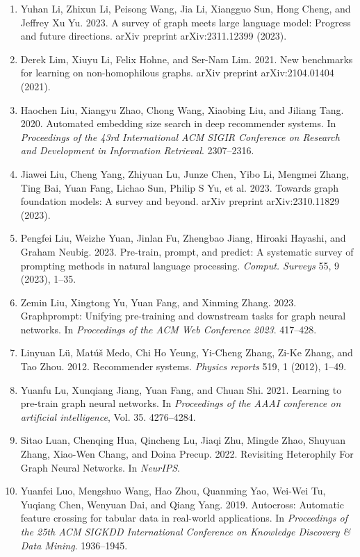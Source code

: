 \documentclass[11pt,UTF8,fontset=fandol]{ctexart}
\begin{document}
\begin{enumerate}[leftmargin=2em,labelsep=0.5em]
\item Yuhan Li, Zhixun Li, Peisong Wang, Jia Li, Xiangguo Sun, Hong Cheng, and Jeffrey Xu Yu. 2023. A survey of graph meets large language model: Progress and future directions. arXiv preprint arXiv:2311.12399 (2023).
\item Derek Lim, Xiuyu Li, Felix Hohne, and Ser-Nam Lim. 2021. New benchmarks for learning on non-homophilous graphs. arXiv preprint arXiv:2104.01404 (2021).
\item Haochen Liu, Xiangyu Zhao, Chong Wang, Xiaobing Liu, and Jiliang Tang. 2020. Automated embedding size search in deep recommender systems. In \textit{Proceedings of the 43rd International ACM SIGIR Conference on Research and Development in Information Retrieval}. 2307--2316.
\item Jiawei Liu, Cheng Yang, Zhiyuan Lu, Junze Chen, Yibo Li, Mengmei Zhang, Ting Bai, Yuan Fang, Lichao Sun, Philip S Yu, et al. 2023. Towards graph foundation models: A survey and beyond. arXiv preprint arXiv:2310.11829 (2023).
\item Pengfei Liu, Weizhe Yuan, Jinlan Fu, Zhengbao Jiang, Hiroaki Hayashi, and Graham Neubig. 2023. Pre-train, prompt, and predict: A systematic survey of prompting methods in natural language processing. \textit{Comput. Surveys} 55, 9 (2023), 1--35.
\item Zemin Liu, Xingtong Yu, Yuan Fang, and Xinming Zhang. 2023. Graphprompt: Unifying pre-training and downstream tasks for graph neural networks. In \textit{Proceedings of the ACM Web Conference 2023}. 417--428.
\item Linyuan L\"u, Mat\'u\v{s} Medo, Chi Ho Yeung, Yi-Cheng Zhang, Zi-Ke Zhang, and Tao Zhou. 2012. Recommender systems. \textit{Physics reports} 519, 1 (2012), 1--49.
\item Yuanfu Lu, Xunqiang Jiang, Yuan Fang, and Chuan Shi. 2021. Learning to pre-train graph neural networks. In \textit{Proceedings of the AAAI conference on artificial intelligence}, Vol. 35. 4276--4284.
\item Sitao Luan, Chenqing Hua, Qincheng Lu, Jiaqi Zhu, Mingde Zhao, Shuyuan Zhang, Xiao-Wen Chang, and Doina Precup. 2022. Revisiting Heterophily For Graph Neural Networks. In \textit{NeurIPS}.
\item Yuanfei Luo, Mengshuo Wang, Hao Zhou, Quanming Yao, Wei-Wei Tu, Yuqiang Chen, Wenyuan Dai, and Qiang Yang. 2019. Autocross: Automatic feature crossing for tabular data in real-world applications. In \textit{Proceedings of the 25th ACM SIGKDD International Conference on Knowledge Discovery \& Data Mining}. 1936--1945.

\end{enumerate}
\end{document}
